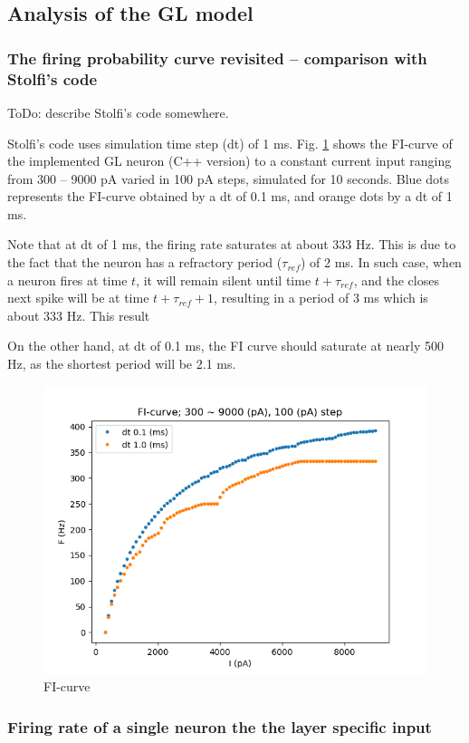 \documentclass[11pt]{scrartcl}
\begin{document}
\subsection{Analysis of the GL model}
\label{sec:org1f80ff6}

\subsubsection{The firing probability curve revisited -- comparison with Stolfi's code}
\label{sec:org8017ec1}

\color{red}
ToDo: describe Stolfi's code somewhere.

Stolfi's code uses simulation time step (dt) of 1 ms. Fig. \ref{fig:DC_FI_9000} shows the FI-curve of the implemented GL neuron (C++ version) to a constant current input ranging from 300 -- 9000 pA varied in 100 pA steps, simulated for 10 seconds. Blue dots represents the FI-curve obtained by a dt of 0.1 ms, and orange dots by a dt of 1 ms.

Note that at dt of 1 ms, the firing rate saturates at about 333 Hz. This is due to the fact that the neuron has a refractory period (\(\tau_{ref}\)) of 2 ms. In such case, when a neuron fires at time \(t\), it will remain silent until time \(t+\tau_{ref}\), and the closes next spike will be at time \(t+\tau_{ref}+1\), resulting in a period of 3 ms which is about 333 Hz. This result 

On the other hand, at dt of 0.1 ms, the FI curve should saturate at nearly 500 Hz, as the shortest period will be 2.1 ms.

\begin{figure}
    \centering
    \includegraphics[width=0.6\linewidth]{figures/DC_FI_9000.png}
    \caption{FI-curve}
    \label{fig:DC_FI_9000}
\end{figure}

\subsubsection{Firing rate of a single neuron the the layer specific input}
\label{sec:orgf57c0d1}
\end{document}
